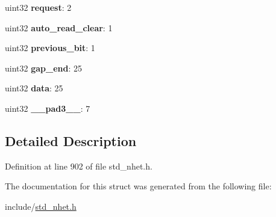 \begin{DoxyCompactItemize}
\item 
\mbox{\label{structacnt__format_a248f30e11a0abdd02d07a3b18dd88fc3}} 
uint32 {\bfseries request}\+: 2
\item 
\mbox{\label{structacnt__format_ae5678a8724b623e96239bf9d99caa4fa}} 
uint32 {\bfseries auto\+\_\+read\+\_\+clear}\+: 1
\item 
\mbox{\label{structacnt__format_ae31d324d897d5ac4849dc1cb78cfa014}} 
uint32 {\bfseries previous\+\_\+bit}\+: 1
\item 
\mbox{\label{structacnt__format_a4241f8cc12d6194fc35be4d97295e653}} 
uint32 {\bfseries gap\+\_\+end}\+: 25
\item 
\mbox{\label{structacnt__format_a1173496c5f23ece635fe41b35864a466}} 
uint32 {\bfseries data}\+: 25
\item 
\mbox{\label{structacnt__format_a1d426616f38341fb4ecc21cd755d3379}} 
uint32 {\bfseries \+\_\+\+\_\+pad3\+\_\+\+\_\+}\+: 7
\end{DoxyCompactItemize}


\subsection{Detailed Description}


Definition at line 902 of file std\+\_\+nhet.\+h.



The documentation for this struct was generated from the following file\+:\begin{DoxyCompactItemize}
\item 
include/\mbox{\hyperlink{std__nhet_8h}{std\+\_\+nhet.\+h}}\end{DoxyCompactItemize}
